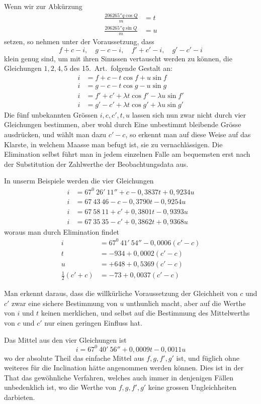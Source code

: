 Wenn wir zur Abkürzung
\[
\begin{aligned}
\frac{206265''q\cos Q}{m}&=t\\
\frac{206265''q\sin Q}{m}&=u
\end{aligned}
\]
setzen, so nehmen unter der Voraussetzung, dass
\[
f+c-i,\quad g-c-i,\quad f'+c'-i,\quad g'-c'-i
\]
klein genug sind, um mit ihren Sinussen vertauscht werden zu können, die Gleichungen $1,2,4,5$ des 15.\ Art.\ folgende Gestalt an:
\[
\begin{aligned}
i&=f+c-t\cos f+u\sin f\\
i&=g-c-t\cos g-u\sin g\\
i&=f'+c'+\lambda t\cos f'-\lambda u\sin f'\\
i&=g'-c'+\lambda t\cos g'+\lambda u\sin g'
\end{aligned}
\]
Die fünf unbekannten Grössen $i,c,c',t,u$ lassen sich nun zwar nicht durch vier Gleichungen bestimmen, aber wohl durch Eine unbestimmt bleibende Grösse ausdrücken, und wählt man dazu $c'-c$, so erkennt man auf diese Weise auf das Klarste, in welchem Maasse man befugt ist, sie zu vernachlässigen. Die Elimination selbst führt man in jedem einzelnen Falle am bequemsten erst nach der Substitution der Zahlwerthe der Beobachtungsdata aus.

In unserm Beispiele werden die vier Gleichungen
\[
\begin{aligned}
i&=67^0\ 26'\ 11''+c-0{,}3837t+0{,}9234u\\
i&=67\ 43\ 46-c-0{,}3790t-0{,}9254u\\
i&=67\ 58\ 11+c'+0{,}3801t-0{,}9393u\\
i&=67\ 35\ 35-c'+0{,}3862t+0{,}9368u
\end{aligned}
\]
woraus man durch Elimination findet
\[
\begin{aligned}
i&=67^0\ 41'\ 54''-0{,}0006(c'-c)\\
t&=-934+0{,}0002(c'-c)\\
u&=+648+0{,}5369(c'-c)\\
\tfrac12(c'+c)&=-73+0{,}0037(c'-c)
\end{aligned}
\]

Man erkennt daraus, dass die willkürliche Voraussetzung der Gleichheit von $c$ und $c'$ zwar eine sichere Bestimmung von $u$ unthunlich macht, aber auf die Werthe von $i$ und $t$ keinen merklichen, und selbst auf die Bestimmung des Mittelwerths von $c$ und $c'$ nur einen geringen Einfluss hat.

Das Mittel aus den vier Gleichungen ist
\[
i=67^0\ 40'\ 56''+0{,}0009t-0{,}0011u
\]
wo der absolute Theil das einfache Mittel aus $f,g,f',g'$ ist, und füglich ohne weiteres für die Inclination hätte angenommen werden können. Dies ist in der That das gewöhnliche Verfahren, welches auch immer in denjenigen Fällen unbedenklich ist, wo die Werthe von $f,g,f',g'$ keine grossen Ungleichheiten darbieten.

